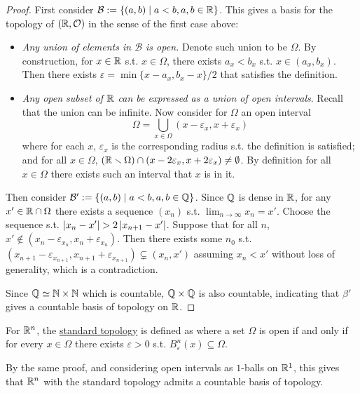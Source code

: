 \documentclass{article}
\begin{document}
\begin{proof}
    First consider $\mathcal{B} := \{(a, b) \mid a < b, a, b \in \mathbb{R}\}$. This gives a basis for the topology of $(\mathbb{R}, \mathcal{O})$ in the sense of the first case above:
    \begin{itemize}
        \item \emph{Any union of elements in $\mathcal{B}$ is open.} Denote such union to be $\Omega$. By construction, for $x \in \mathbb{R}$ s.t. $x \in \Omega$, there exists $a_x < b_x$ s.t. $x \in (a_x, b_x)$. Then there exists $\varepsilon = \min\{x - a_x, b_x - x\} / 2$ that satisfies the definition.
        \item \emph{Any open subset of $\mathbb{R}$ can be expressed as a union of open intervals}. Recall that the union can be infinite. Now consider for $\Omega$ an open interval
        \[
            \Omega = \bigcup_{x \in \Omega} (x - \varepsilon_x, x + \varepsilon_x)
        \]
        where for each $x$, $\varepsilon_x$ is the corresponding radius s.t. the definition is satisfied; and for all $x \in \Omega$, $(\mathbb{R} \smallsetminus \Omega) \cap (x - 2\varepsilon_x, x + 2\varepsilon_x) \neq \emptyset$. By definition for all $x \in \Omega$ there exists such an interval that $x$ is in it.
    \end{itemize}
    Then consider $\mathcal{B}' := \{(a, b) \mid a < b, a, b \in \mathbb{Q}\}$. Since $\mathbb{Q}$ is dense in $\mathbb{R}$, for any $x' \in \mathbb{R} \cap \Omega$ there exists a sequence $(x_n)$ s.t. $\lim_{n \to \infty} x_n = x'$. Choose the sequence s.t. $\left|x_n - x'\right| > 2\left|x_{n+1} - x'\right|$. Suppose that for all $n$, $x' \notin (x_n - \varepsilon_{x_n}, x_n + \varepsilon_{x_n})$. Then there exists some $n_0$ s.t. $(x_{n+1} - \varepsilon_{x_{n+1}}, x_{n+1} + \varepsilon_{x_{n+1}}) \subsetneq (x_n, x')$ assuming $x_n < x'$ without loss of generality, which is a contradiction.

    Since $\mathbb{Q} \simeq \mathbb{N} \times \mathbb{N}$ which is countable, $\mathbb{Q} \times \mathbb{Q}$ is also countable, indicating that $\beta'$ gives a countable basis of topology on $\mathbb{R}$.
\end{proof}

\begin{remark}
    For $\mathbb{R}^n$, the \underline{standard topology} is defined as where a set $\Omega$ is open if and only if for every $x \in \Omega$ there exists $\varepsilon > 0$ s.t. $B_{\varepsilon}^n (x) \subseteq \Omega$. 
\end{remark}

\begin{corollary}
    By the same proof, and considering open intervals as $1$-balls on $\mathbb{R}^1$, this gives that $\mathbb{R}^n$ with the standard topology admits a countable basis of topology. 
\end{corollary}
\end{document}
